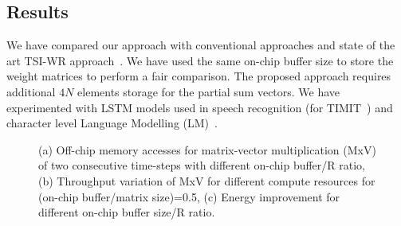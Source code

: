 \documentclass[a4paper,10pt]{article}
\begin{document}
\subsection{Results}
We have compared our approach with conventional approaches and state of the art TSI-WR approach~\cite{park2020time}. We have used the same on-chip buffer size to store the weight matrices to perform a fair comparison. The proposed approach requires additional $4N$ elements storage for the partial sum vectors. We have experimented with LSTM models used in speech recognition (for TIMIT~\cite{garofolo1993timit}) and character level Language Modelling (LM)~\cite{sundermeyer2015feedforward}.
\begin{figure}[htb!]
	\centering
	\caption{ (a) Off-chip memory accesses for matrix-vector multiplication (MxV) of two consecutive time-steps with different on-chip buffer/R ratio, (b) Throughput variation of MxV for different compute resources for (on-chip buffer/matrix size){=}0.5, (c) Energy improvement for different on-chip buffer size/R ratio.}
	\label{fig:throughputVsPF}
	\vspace{-1.0em}	
\end{figure}
\end{document}
